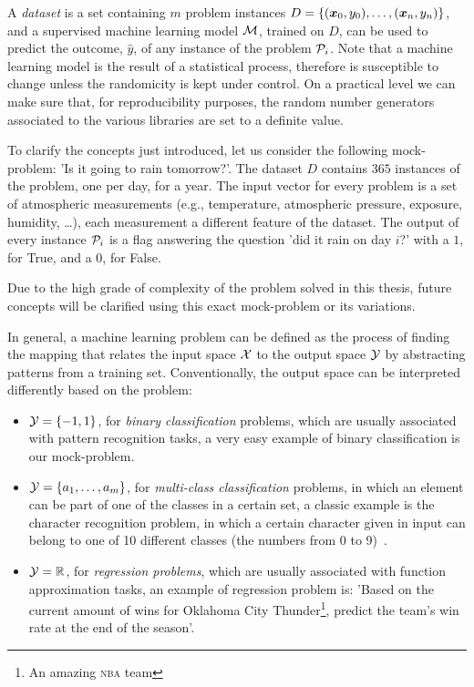 A \emph{dataset} is a set containing $m$ problem instances $D = \{(\boldsymbol{x}_0, y_0), \ldots, (\boldsymbol{x}_n, y_n)\}$, and
a supervised machine learning model $\mathcal{M}$, trained on $D$, can be used to predict the outcome,
$\hat{y}$, of any instance of the problem $\mathcal{P}_i$. Note that a machine learning model is the result of a
statistical process, therefore is susceptible to change unless the randomicity is kept under control.
On a practical level we can make sure that, for reproducibility purposes, the random number
generators associated to the various libraries are set to a definite value.

\medskip

To clarify the concepts just introduced, let us consider the following mock-problem: 'Is it going to rain
tomorrow?'. The dataset $D$ contains $365$ instances of the problem, one per day, for a year. The
input vector for every problem is a set of atmospheric measurements (e.g., temperature, atmospheric
pressure, exposure, humidity, \ldots), each measurement a different feature of the dataset. The
output of every instance $\mathcal{P}_i$ is a flag answering the question 'did it rain on day $i$?'
with a $1$, for True, and a $0$, for False.

Due to the high grade of complexity of the problem solved in this thesis, future concepts will be clarified
using this exact mock-problem or its variations.

\medskip

In general, a machine learning problem can be defined as the process of finding the mapping that
relates the input space $\mathcal{X}$ to the output space $\mathcal{Y}$ by abstracting patterns from
a training set. Conventionally, the output space can be interpreted differently based on
the problem:
\begin{itemize}
	\item $\mathcal{Y} = \{-1, 1\}$, for \emph{binary classification} problems, which are usually
	      associated with pattern recognition tasks, a very easy example of binary classification is our mock-problem.
	\item $\mathcal{Y} = \{a_1,\ldots, a_m\}$, for \emph{multi-class classification} problems, in
	      which an element can be part of one of the classes in a certain set, a classic
	      example is the character recognition problem, in which a certain character given in input can belong to one of 10 different classes (the numbers from 0 to 9)~\cite{pal2010handwritten}.
	\item $\mathcal{Y} = \mathbb{R}$, for \emph{regression problems}, which are usually associated
	      with function approximation tasks, an example of regression problem
	      is: 'Based on the current amount of wins for Oklahoma City Thunder\footnote{An
		      amazing \textsc{nba} team}, predict the team's win rate at the end of the season'.
\end{itemize}

